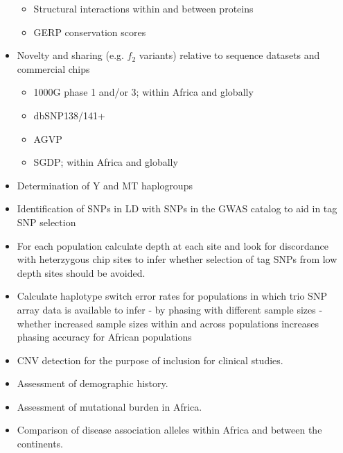 \begin{itemize}
\begin{itemize}
   \item{Structural interactions within and between proteins
   }
   \item{GERP conservation scores}
  \end{itemize}
 \item Novelty and sharing (e.g. $f_2$ variants) relative to sequence datasets and commercial chips
 \begin{itemize}
  \item 1000G phase 1 and/or 3; within Africa and globally
  \item dbSNP138/141+
  \item AGVP
  \item SGDP; within Africa and globally
 \end{itemize}
 \item{Determination of Y and MT haplogroups
 }
 \item Identification of SNPs in LD with SNPs in the GWAS catalog to aid in tag SNP selection
 \item For each population calculate depth at each site and look for discordance with heterzygous chip sites to infer whether selection of tag SNPs from low depth sites should be avoided.
 \item {Calculate haplotype switch error rates for populations in which trio SNP array data is available to infer - by phasing with different sample sizes - whether increased sample sizes within and across populations increases phasing accuracy for African populations
 }
  \item CNV detection for the purpose of inclusion for clinical studies.
  \item Assessment of demographic history.
  \item Assessment of mutational burden in Africa.
  \item Comparison of disease association alleles within Africa and between the continents.
\end{itemize}


